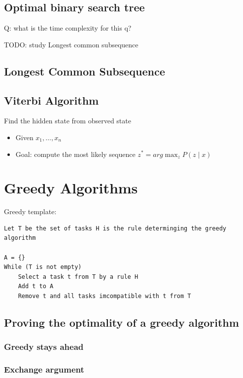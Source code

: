 \documentclass[12pt,a4paper]{article}
\begin{document}
\subsection*{Optimal binary search tree}

Q: what is the time complexity for this q?

TODO: study Longest common subsequence

\subsection*{Longest Common Subsequence}

\subsection*{Viterbi Algorithm}

Find the hidden state from observed state

\begin{itemize}
    \item Given \(x_1,\dots,x_n\)
    \item Goal: compute the most likely sequence \(z^* = arg\max_z P(z\mid x)\)
\end{itemize}

\section*{Greedy Algorithms}

Greedy template:
\begin{verbatim}
Let T be the set of tasks H is the rule determinging the greedy algorithm

A = {}
While (T is not empty)
    Select a task t from T by a rule H
    Add t to A
    Remove t and all tasks imcompatible with t from T
\end{verbatim}

\subsection*{Proving the optimality of a greedy algorithm}

\subsubsection*{Greedy stays ahead}

\subsubsection*{Exchange argument}
\end{document}
